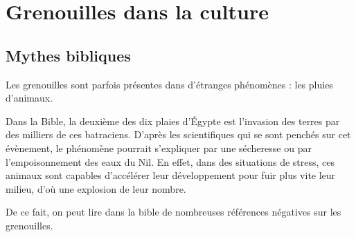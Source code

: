 \section{Grenouilles dans la culture}
\subsection{Mythes bibliques}
Les grenouilles sont parfois présentes dans d'étranges phénomènes : les pluies d'animaux.

Dans la Bible, la deuxième des dix plaies d'Égypte est l'invasion des terres par des milliers de ces batraciens. 
D'après les scientifiques qui se sont penchés sur cet évènement, le phénomène pourrait s'expliquer par une sécheresse ou par l'empoisonnement des eaux du Nil.
 En effet, dans des situations de stress, ces animaux sont capables d'accélérer leur développement pour fuir plus vite leur milieu, d'où une explosion de leur nombre.

De ce fait, on peut lire dans la bible de nombreuses références négatives sur les grenouilles.

